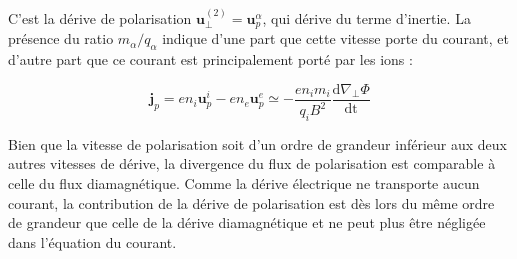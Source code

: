 \begin{refsection}
C'est la dérive de polarisation $\mathbf{u}_\perp^{(2)}=\mathbf u^\alpha_p$, qui
dérive du terme d'inertie. La présence du ratio $m_\alpha/q_\alpha$ indique
d'une part que cette vitesse porte du courant, et d'autre part que ce
courant est principalement porté par les ions :

\begin{equation}
\label{1-courantPol}
\mathbf{j}_p = en_i\mathbf u^i_p-en_e\mathbf u^e_p\simeq
-\frac{en_im_i}{q_i B^2}\frac{\text{d}\nabla_\perp \Phi}{\text{dt}}
\end{equation}

Bien que la vitesse de polarisation soit d'un ordre de
grandeur inférieur aux deux autres vitesses de dérive, la divergence du flux 
de polarisation est comparable à celle du flux diamagnétique. Comme
la dérive électrique ne transporte aucun courant, la
contribution de la dérive de polarisation est dès lors du même ordre de
grandeur que celle de la dérive diamagnétique et ne peut plus être négligée
dans l'équation du courant.

%
%
\end{refsection}

